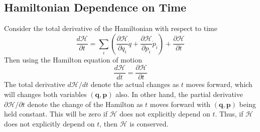 \documentclass[../../../main.tex]{subfiles}
\begin{document}
\subsection*{Hamiltonian Dependence on Time}
Consider the total derivative of the Hamiltonian with respect to time 
\begin{equation*}
    \frac{d\mathcal{H}}{\partial t}=\sum_{i}\left(\frac{\partial\mathcal{H}}{\partial q_i}\dot{q}+\frac{\partial\mathcal{H}}{\partial p_i}\dot{p}_i\right)+\frac{\partial\mathcal{H}}{\partial t}
\end{equation*}
Then using the Hamilton equation of motion
\begin{equation*}
    \frac{d\mathcal{H}}{dt}=\frac{\partial\mathcal{H}}{\partial t}
\end{equation*}
The total derivative $d\mathcal{H}/d t$ denote the actual changes as $t$ moves forward, which will changes both variables $(\mathbf{q},\mathbf{p})$ also.
In other hand, the partial derivative $\partial\mathcal{H}/\partial t$ denote the change of the Hamilton as $t$ moves forward with $(\mathbf{q},\mathbf{p})$ being held constant. 
This will be zero if $\mathcal{H}$ does not explicitly depend on $t$.
Thus, if $\mathcal{H}$ does not explicitly depend on $t$, then $\mathcal{H}$ is conserved.
\end{document}
